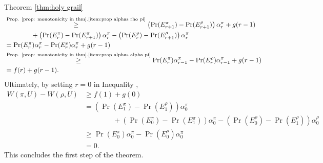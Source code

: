 \begin{proofof}{Theorem \ref{thm:holy grail}}
{\begin{align*}
&\stackrel{\textnormal{Prop. \ref{prop: monotonicity in thm}.\ref{item:prop alphas rho pi}}}{\geq} \left( \Pr(E^\pi_{r+1})-\Pr(E^\rho_{r+1}) \right)\alpha^\pi_{r}+g(r-1)\\
&\qquad \qquad +\left(\Pr(E^\pi_{r})-\Pr(E^\pi_{r+1})\right) \alpha^\pi_r-\left(\Pr(E^\rho_{r})-\Pr(E^\rho_{r+1})\right) \alpha^\pi_r\\
&=\Pr(E^\pi_{r})\alpha^\pi_r-\Pr(E^\rho_{r}) \alpha^\pi_r +g(r-1)\\
&\stackrel{\textnormal{Prop. \ref{prop: monotonicity in thm}.\ref{item:prop alphas alpha pi}}}{\geq}\Pr(E^\pi_{r})\alpha^\pi_{r-1}-\Pr(E^\rho_{r}) \alpha^\pi_{r-1} +g(r-1)\\
&= f(r)+g(r-1).
\end{align*}}%
Ultimately, by setting $r=0$ in Inequality ,
\begin{align*}
W(\pi,U)-W(\rho,U)&\geq f(1)+g(0)\\
&=\left( \Pr(E^\pi_{1})-\Pr(E^\rho_{1}) \right)\alpha^\pi_{0}\\
&\qquad \qquad +\left(\Pr(E^\pi_{0})-\Pr(E^\pi_{1})\right) \alpha^\pi_0-\left(\Pr(E^\rho_{0})-\Pr(E^\rho_{1})\right) \alpha^\rho_0\\
&\geq\Pr(E^\pi_{0}) \alpha^\pi_0-\Pr(E^\rho_{0}) \alpha^\pi_0\\
&=0.
\end{align*}
This concludes the first step of the theorem.

\end{proofof}

